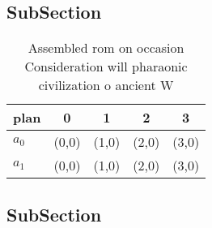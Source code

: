 \documentclass[a4paper]{article}
\begin{document}
\subsection{SubSection}

\begin{table}
\begin{adjustbox}{width=0.5\columnwidth}
\begin{tabular}{|l|l|l|l|l|}
\hline
\textbf{plan} & \multicolumn{1}{c|}{\textbf{0}} & \multicolumn{1}{c|}{\textbf{1}} & \multicolumn{1}{c|}{\textbf{2}} & \multicolumn{1}{c|}{\textbf{3}} \\ \hline
\textbf{$a_0$}  & (0,0) & (1,0) & (2,0) & (3,0) \\ \hline
\textbf{$a_1$}  & (0,0) & (1,0) & (2,0) & (3,0) \\ \hline
\end{tabular}
\end{adjustbox}
\caption{Assembled rom on occasion Consideration will pharaonic civilization o ancient W
}
\end{table}

\subsection{SubSection}
\end{document}
